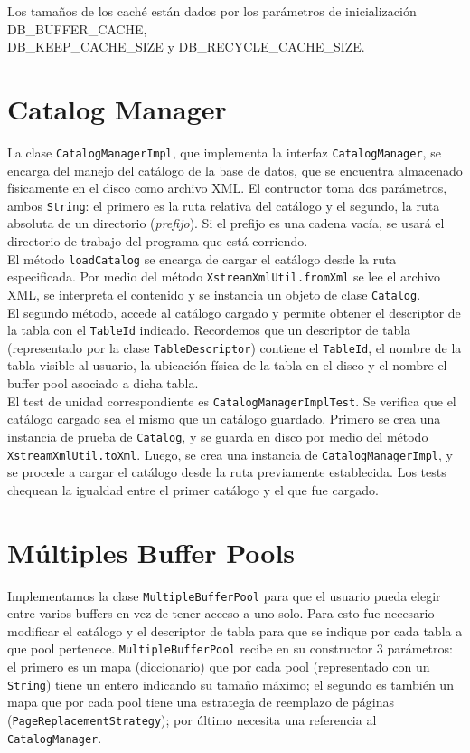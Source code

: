 \documentclass[a4paper,10pt]{article}
\begin{document}
Los tamaños de los caché están dados por los parámetros de inicialización DB\_BUFFER\_CACHE,\\DB\_KEEP\_CACHE\_SIZE y DB\_RECYCLE\_CACHE\_SIZE.


\newpage

\section{Catalog Manager}

La clase \texttt{CatalogManagerImpl}, que implementa la interfaz \texttt{CatalogManager}, se encarga del manejo del catálogo de la base de datos, que se encuentra almacenado físicamente en el disco como archivo XML. El contructor toma dos parámetros, ambos \texttt{String}: el primero es la ruta relativa del catálogo y el segundo, la ruta absoluta de un directorio (\textit{prefijo}). Si el prefijo es una cadena vacía, se usará
el directorio de trabajo del programa que está corriendo.\\

El método \texttt{loadCatalog} se encarga de cargar el catálogo desde la ruta especificada. Por medio del método \texttt{XstreamXmlUtil.fromXml} se lee el archivo XML, se interpreta el contenido y se instancia un objeto de clase \texttt{Catalog}.\\

El segundo método, accede al catálogo cargado y permite obtener el descriptor de la tabla con el \texttt{TableId} indicado. Recordemos que un descriptor de tabla (representado por la clase \texttt{TableDescriptor}) contiene el \texttt{TableId}, el nombre de la tabla visible al usuario, la ubicación física de la tabla en el disco y el nombre el buffer pool asociado a dicha tabla.\\

El test de unidad correspondiente es \texttt{CatalogManagerImplTest}. Se verifica que el catálogo cargado sea el mismo que un catálogo guardado. Primero se crea una instancia de prueba de \texttt{Catalog}, y se guarda en disco por medio del método \texttt{XstreamXmlUtil.toXml}. Luego, se crea una instancia de \texttt{CatalogManagerImpl}, y se procede a cargar el catálogo desde la ruta previamente establecida. Los tests chequean la igualdad entre el primer catálogo y el que fue
cargado.\\


\section{Múltiples Buffer Pools}
Implementamos la clase \texttt{MultipleBufferPool} para que el usuario pueda elegir entre varios buffers en vez de tener acceso a uno solo. Para esto fue necesario modificar el catálogo y el descriptor de tabla para que se indique por cada tabla a que pool pertenece. \texttt{MultipleBufferPool} recibe en su constructor 3 parámetros: el primero es un mapa (diccionario) que por cada pool (representado con un \texttt{String}) tiene un entero indicando su tamaño máximo; el segundo es también un mapa que por cada pool tiene una estrategia de reemplazo de páginas (\texttt{PageReplacementStrategy}); por último necesita una referencia al \texttt{CatalogManager}.\\
\end{document}
